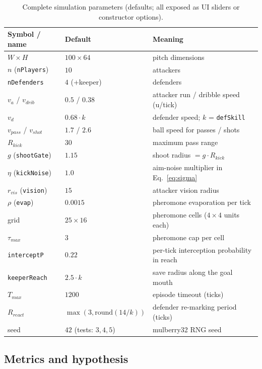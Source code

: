 \documentclass[11pt,a4paper]{article}
\begin{document}
\begin{table}[H]
\centering
\caption{Complete simulation parameters (defaults; all exposed as UI sliders or constructor options).}
\label{tab:params}
\small
\begin{tabular}{@{}llp{7.2cm}@{}}
\toprule
\textbf{Symbol / name} & \textbf{Default} & \textbf{Meaning}\\
\midrule
$W\times H$ & $100\times64$ & pitch dimensions\\
$n$ (\texttt{nPlayers}) & $10$ & attackers\\
\texttt{nDefenders} & $4$ (+keeper) & defenders\\
$v_a$ / $v_{drib}$ & $0.5$ / $0.38$ & attacker run / dribble speed (u/tick)\\
$v_d$ & $0.68\cdot k$ & defender speed; $k$ = \texttt{defSkill}\\
$v_{pass}$ / $v_{shot}$ & $1.7$ / $2.6$ & ball speed for passes / shots\\
$R_{kick}$ & $30$ & maximum pass range\\
$g$ (\texttt{shootGate}) & $1.15$ & shoot radius $= g\cdot R_{kick}$\\
$\eta$ (\texttt{kickNoise}) & $1.0$ & aim-noise multiplier in Eq.~\eqref{eq:sigma}\\
$r_{vis}$ (\texttt{vision}) & $15$ & attacker vision radius\\
$\rho$ (\texttt{evap}) & $0.0015$ & pheromone evaporation per tick\\
grid & $25\times16$ & pheromone cells ($4\times4$ units each)\\
$\tau_{max}$ & $3$ & pheromone cap per cell\\
\texttt{interceptP} & $0.22$ & per-tick interception probability in reach\\
\texttt{keeperReach} & $2.5\cdot k$ & save radius along the goal mouth\\
$T_{max}$ & $1200$ & episode timeout (ticks)\\
$R_{react}$ & $\max(3,\mathrm{round}(14/k))$ & defender re-marking period (ticks)\\
seed & $42$ (tests: $3,4,5$) & mulberry32 RNG seed\\
\bottomrule
\end{tabular}
\end{table}

\subsection{Metrics and hypothesis}
\end{document}
